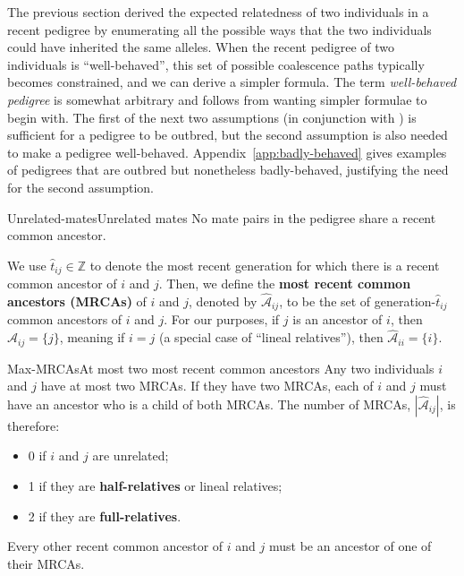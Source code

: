 \documentclass[12pt]{article}
\numberwithin{equation}{section}
\begin{document}
The previous section derived the expected relatedness of two individuals in a recent pedigree by enumerating all the possible ways that the two individuals could have inherited the same alleles.
When the recent pedigree of two individuals is ``well-behaved'', this set of possible coalescence paths typically becomes constrained, and we can derive a simpler formula.
The term \emph{well-behaved pedigree} is somewhat arbitrary and follows from wanting simpler formulae to begin with.
The first of the next two assumptions (in conjunction with ) is sufficient for a pedigree to be outbred, but the second assumption is also needed to make a pedigree well-behaved.
Appendix~\ref{app:badly-behaved} gives examples of pedigrees that are outbred but nonetheless badly-behaved, justifying the need for the second assumption.
\begin{assumption}{Unrelated-mates}{Unrelated mates}
    No mate pairs in the pedigree share a recent common ancestor.
\end{assumption}
We use $\hat{t}_{ij} \in \mathbb{Z}$ to denote the most recent generation for which there is a recent common ancestor of $i$ and $j$.
Then, we define the \textbf{most recent common ancestors (MRCAs)} of $i$ and $j$, denoted by $\widehat{\mathcal{A}}_{ij}$, to be the set of generation-$\hat{t}_{ij}$ common ancestors of $i$ and $j$.
For our purposes, if $j$ is an ancestor of $i$, then $\widehat{\mathcal{A}}_{ij} = \{j \}$, meaning if $i=j$ (a special case of ``lineal relatives''), then $\widehat{\mathcal{A}}_{ii} = \{i \}$.
\begin{assumption}{Max-MRCAs}{At most two most recent common ancestors}
    Any two individuals $i$ and $j$ have at most two MRCAs.
    If they have two MRCAs, each of $i$ and $j$ must have an ancestor who is a child of both MRCAs.
    The number of MRCAs, $|\widehat{\mathcal{A}}_{ij}|$, is therefore:
    \begin{itemize}
        \item 0 if $i$ and $j$ are unrelated;
        \item 1 if they are \textbf{half-relatives} or lineal relatives;
        \item 2 if they are \textbf{full-relatives}.
    \end{itemize}
    Every other recent common ancestor of $i$ and $j$ must be an ancestor of one of their MRCAs.
\end{assumption}
\end{document}
